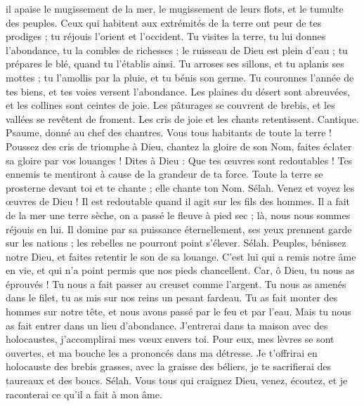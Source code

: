\begin{multicols}{2}
il apaise le mugissement de la mer, le mugissement de leurs flots, et le tumulte des peuples.
Ceux qui habitent aux extrémités de la terre ont peur de tes prodiges ; tu réjouis l'orient et l'occident.
Tu visites la terre, tu lui donnes l'abondance, tu la combles de richesses ; le ruisseau de Dieu est plein d'eau ; tu prépares le blé, quand tu l'établis ainsi.
Tu arroses ses sillons, et tu aplanis ses mottes ; tu l'amollis par la pluie, et tu bénis son germe.
Tu couronnes l'année de tes biens, et tes voies versent l'abondance.
Les plaines du désert sont abreuvées, et les collines sont ceintes de joie.
Les pâturages se couvrent de brebis, et les vallées se revêtent de froment. Les cris de joie et les chants retentissent.
\VerseOne{}Cantique. Psaume, donné au chef des chantres. Vous tous habitants de toute la terre ! Poussez des cris de triomphe à Dieu,
chantez la gloire de son Nom, faites éclater sa gloire par vos louanges !
Dites à Dieu : Que tes œuvres sont redoutables ! Tes ennemis te mentiront à cause de la grandeur de ta force.
Toute la terre se prosterne devant toi et te chante ; elle chante ton Nom. Sélah.
Venez et voyez les œuvres de Dieu ! Il est redoutable quand il agit sur les fils des hommes.
Il a fait de la mer une terre sèche, on a passé le fleuve à pied sec ; là, nous nous sommes réjouis en lui.
Il domine par sa puissance éternellement, ses yeux prennent garde sur les nations ; les rebelles ne pourront point s'élever. Sélah.
Peuples, bénissez notre Dieu, et faites retentir le son de sa louange.
C'est lui qui a remis notre âme en vie, et qui n'a point permis que nos pieds chancellent.
Car, ô Dieu, tu nous as éprouvés ! Tu nous a fait passer au creuset comme l'argent.
Tu nous as amenés dans le filet, tu as mis sur nos reins un pesant fardeau.
Tu as fait monter des hommes sur notre tête, et nous avons passé par le feu et par l'eau. Mais tu nous as fait entrer dans un lieu d'abondance.
J'entrerai dans ta maison avec des holocaustes, j'accomplirai mes vœux envers toi.
Pour eux, mes lèvres se sont ouvertes, et ma bouche les a prononcés dans ma détresse.
Je t'offrirai en holocauste des brebis grasses, avec la graisse des béliers, je te sacrifierai des taureaux et des boucs. Sélah.
Vous tous qui craignez Dieu, venez, écoutez, et je raconterai ce qu'il a fait à mon âme.

\end{multicols}

